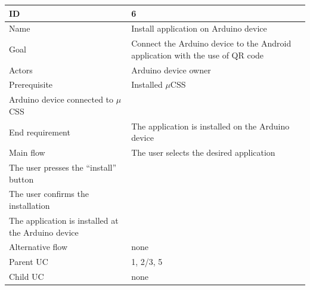 \begin{table}
    \begin{tabular}{|l|l|}
        \hline
        ID               & 6                                                                                                                                                                                    \\ \hline
        Name             & Install application on Arduino device                                                                                                                                                \\ 
        Goal             & Connect the Arduino device to the Android application with the use of QR code                                                                                                        \\ 
        Actors           & Arduino device owner                                                                                                                                                                 \\ 
        Prerequisite     &     Installed $\mu$CSS \\     Arduino device connected to $\mu$CSS                                                                                                                   \\ 
        End requirement  & The application is installed on the Arduino device                                                                                                                                   \\ 
        Main flow        &     The user selects the desired application \\     The user presses the “install” button \\     The user confirms the installation \\     The application is installed at the Arduino device \\ 
        Alternative flow & none                                                                                                                                                                                 \\ 
        Parent UC        & 1, 2/3, 5                                                                                                                                                                         \\ 
        Child UC         & none                                                                                                                                                                                 \\
        \hline
    \end{tabular}
\end{table}


